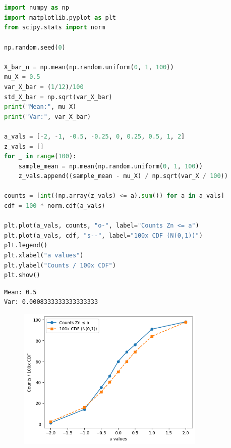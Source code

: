 \documentclass[11pt,a4paper,margin=1in]{article}
\begin{document}
\section{}
\begin{lstlisting}[language=python]
import numpy as np
import matplotlib.pyplot as plt
from scipy.stats import norm

np.random.seed(0)

X_bar_n = np.mean(np.random.uniform(0, 1, 100))
mu_X = 0.5
var_X_bar = (1/12)/100
std_X_bar = np.sqrt(var_X_bar)
print("Mean:", mu_X)
print("Var:", var_X_bar)

a_vals = [-2, -1, -0.5, -0.25, 0, 0.25, 0.5, 1, 2]
z_vals = []
for _ in range(100):
    sample_mean = np.mean(np.random.uniform(0, 1, 100))
    z_vals.append((sample_mean - mu_X) / np.sqrt(var_X / 100))

counts = [int((np.array(z_vals) <= a).sum()) for a in a_vals]
cdf = 100 * norm.cdf(a_vals)

plt.plot(a_vals, counts, "o-", label="Counts Zn <= a")
plt.plot(a_vals, cdf, "s--", label="100x CDF (N(0,1))")
plt.legend()
plt.xlabel("a values")
plt.ylabel("Counts / 100x CDF")
plt.show()
\end{lstlisting}
\begin{verbatim}
Mean: 0.5
Var: 0.0008333333333333333
\end{verbatim}
\begin{figure}[H]
    \centering
    \includegraphics[width=0.8\textwidth]{3.png}
\end{figure}
\end{document}
